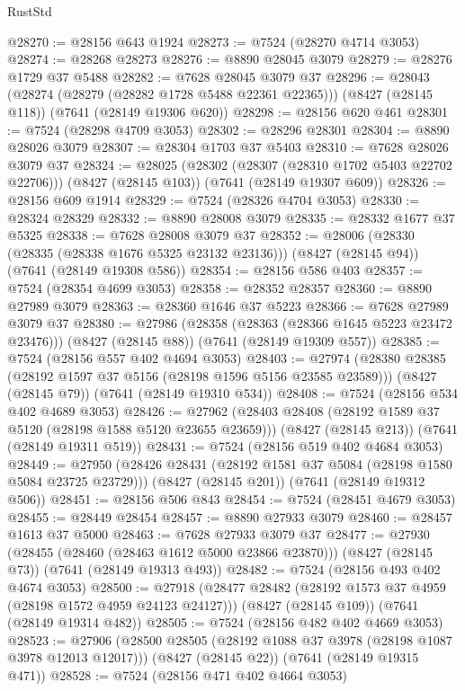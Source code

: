 \begin{lexlean}{RustStd}
\begin{coremodule}
@28270 := @28156 @643 @1924
@28273 := @7524 (@28270 @4714 @3053)
@28274 := @28268 @28273
@28276 := @8890 @28045 @3079
@28279 := @28276 @1729 @37 @5488
@28282 := @7628 @28045 @3079 @37
@28296 := @28043
    (@28274 (@28279 (@28282 @1728 @5488 @22361 @22365)))
    (@8427 (@28145 @118))
    (@7641 (@28149 @19306 @620))
@28298 := @28156 @620 @461
@28301 := @7524 (@28298 @4709 @3053)
@28302 := @28296 @28301
@28304 := @8890 @28026 @3079
@28307 := @28304 @1703 @37 @5403
@28310 := @7628 @28026 @3079 @37
@28324 := @28025
    (@28302 (@28307 (@28310 @1702 @5403 @22702 @22706)))
    (@8427 (@28145 @103))
    (@7641 (@28149 @19307 @609))
@28326 := @28156 @609 @1914
@28329 := @7524 (@28326 @4704 @3053)
@28330 := @28324 @28329
@28332 := @8890 @28008 @3079
@28335 := @28332 @1677 @37 @5325
@28338 := @7628 @28008 @3079 @37
@28352 := @28006
    (@28330 (@28335 (@28338 @1676 @5325 @23132 @23136)))
    (@8427 (@28145 @94))
    (@7641 (@28149 @19308 @586))
@28354 := @28156 @586 @403
@28357 := @7524 (@28354 @4699 @3053)
@28358 := @28352 @28357
@28360 := @8890 @27989 @3079
@28363 := @28360 @1646 @37 @5223
@28366 := @7628 @27989 @3079 @37
@28380 := @27986
    (@28358 (@28363 (@28366 @1645 @5223 @23472 @23476)))
    (@8427 (@28145 @88))
    (@7641 (@28149 @19309 @557))
@28385 := @7524 (@28156 @557 @402 @4694 @3053)
@28403 := @27974
    (@28380 @28385 (@28192 @1597 @37 @5156 (@28198 @1596 @5156 @23585 @23589)))
    (@8427 (@28145 @79))
    (@7641 (@28149 @19310 @534))
@28408 := @7524 (@28156 @534 @402 @4689 @3053)
@28426 := @27962
    (@28403 @28408 (@28192 @1589 @37 @5120 (@28198 @1588 @5120 @23655 @23659)))
    (@8427 (@28145 @213))
    (@7641 (@28149 @19311 @519))
@28431 := @7524 (@28156 @519 @402 @4684 @3053)
@28449 := @27950
    (@28426 @28431 (@28192 @1581 @37 @5084 (@28198 @1580 @5084 @23725 @23729)))
    (@8427 (@28145 @201))
    (@7641 (@28149 @19312 @506))
@28451 := @28156 @506 @843
@28454 := @7524 (@28451 @4679 @3053)
@28455 := @28449 @28454
@28457 := @8890 @27933 @3079
@28460 := @28457 @1613 @37 @5000
@28463 := @7628 @27933 @3079 @37
@28477 := @27930
    (@28455 (@28460 (@28463 @1612 @5000 @23866 @23870)))
    (@8427 (@28145 @73))
    (@7641 (@28149 @19313 @493))
@28482 := @7524 (@28156 @493 @402 @4674 @3053)
@28500 := @27918
    (@28477 @28482 (@28192 @1573 @37 @4959 (@28198 @1572 @4959 @24123 @24127)))
    (@8427 (@28145 @109))
    (@7641 (@28149 @19314 @482))
@28505 := @7524 (@28156 @482 @402 @4669 @3053)
@28523 := @27906
    (@28500 @28505 (@28192 @1088 @37 @3978 (@28198 @1087 @3978 @12013 @12017)))
    (@8427 (@28145 @22))
    (@7641 (@28149 @19315 @471))
@28528 := @7524 (@28156 @471 @402 @4664 @3053)

\end{coremodule}
\end{lexlean}
